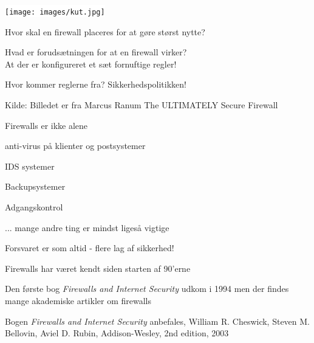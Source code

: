 \documentclass[Screen16to9,17pt]{foils}
\begin{document}

\begin{center}
\colorbox{white}{\texttt{[image: images/kut.jpg]}}
\end{center}

\begin{list1}
\item Hvor skal en firewall placeres for at gøre størst nytte?
\item Hvad er forudsætningen for at en firewall virker?\\
At der er konfigureret et sæt fornuftige regler!
\item Hvor kommer reglerne fra? Sikkerhedspolitikken!
\end{list1}


\centerline{\small Kilde: Billedet er fra Marcus Ranum The ULTIMATELY
  Secure Firewall}



\begin{list1}
\item Firewalls er ikke alene
\begin{list2}
\item anti-virus på klienter og postsystemer
\item IDS systemer
\item Backupsystemer
\item Adgangskontrol
\item ... mange andre ting er mindst ligeså vigtige
\end{list2}
\end{list1}

\centerline{\hlkbig Forsvaret er som altid - flere lag af sikkerhed! }





\begin{list1}
\item Firewalls har været kendt siden starten af 90'erne
\item Den første bog \emph{Firewalls and Internet Security} udkom i
  1994 men der findes mange akademiske artikler om firewalls
\item Bogen \emph{Firewalls and Internet Security} anbefales,
William R. Cheswick, Steven M. Bellovin, Aviel D. Rubin,
Addison-Wesley, 2nd edition, 2003
\end{list1}
\end{document}
